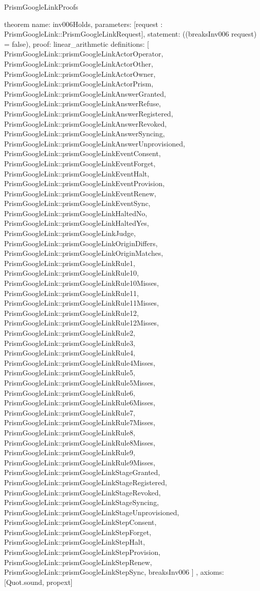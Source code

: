 \begin{lexlean}{PrismGoogleLinkProofs}
\begin{semanticmodule}
theorem{
  name: inv006Holds,
  parameters: [request : PrismGoogleLink::PrismGoogleLinkRequest],
  statement: ((breaksInv006 request) = false),
  proof: linear_arithmetic{
    definitions: [
      PrismGoogleLink::prismGoogleLinkActorOperator,
      PrismGoogleLink::prismGoogleLinkActorOther,
      PrismGoogleLink::prismGoogleLinkActorOwner,
      PrismGoogleLink::prismGoogleLinkActorPrism,
      PrismGoogleLink::prismGoogleLinkAnswerGranted,
      PrismGoogleLink::prismGoogleLinkAnswerRefuse,
      PrismGoogleLink::prismGoogleLinkAnswerRegistered,
      PrismGoogleLink::prismGoogleLinkAnswerRevoked,
      PrismGoogleLink::prismGoogleLinkAnswerSyncing,
      PrismGoogleLink::prismGoogleLinkAnswerUnprovisioned,
      PrismGoogleLink::prismGoogleLinkEventConsent,
      PrismGoogleLink::prismGoogleLinkEventForget,
      PrismGoogleLink::prismGoogleLinkEventHalt,
      PrismGoogleLink::prismGoogleLinkEventProvision,
      PrismGoogleLink::prismGoogleLinkEventRenew,
      PrismGoogleLink::prismGoogleLinkEventSync,
      PrismGoogleLink::prismGoogleLinkHaltedNo,
      PrismGoogleLink::prismGoogleLinkHaltedYes,
      PrismGoogleLink::prismGoogleLinkJudge,
      PrismGoogleLink::prismGoogleLinkOriginDiffers,
      PrismGoogleLink::prismGoogleLinkOriginMatches,
      PrismGoogleLink::prismGoogleLinkRule1,
      PrismGoogleLink::prismGoogleLinkRule10,
      PrismGoogleLink::prismGoogleLinkRule10Misses,
      PrismGoogleLink::prismGoogleLinkRule11,
      PrismGoogleLink::prismGoogleLinkRule11Misses,
      PrismGoogleLink::prismGoogleLinkRule12,
      PrismGoogleLink::prismGoogleLinkRule12Misses,
      PrismGoogleLink::prismGoogleLinkRule2,
      PrismGoogleLink::prismGoogleLinkRule3,
      PrismGoogleLink::prismGoogleLinkRule4,
      PrismGoogleLink::prismGoogleLinkRule4Misses,
      PrismGoogleLink::prismGoogleLinkRule5,
      PrismGoogleLink::prismGoogleLinkRule5Misses,
      PrismGoogleLink::prismGoogleLinkRule6,
      PrismGoogleLink::prismGoogleLinkRule6Misses,
      PrismGoogleLink::prismGoogleLinkRule7,
      PrismGoogleLink::prismGoogleLinkRule7Misses,
      PrismGoogleLink::prismGoogleLinkRule8,
      PrismGoogleLink::prismGoogleLinkRule8Misses,
      PrismGoogleLink::prismGoogleLinkRule9,
      PrismGoogleLink::prismGoogleLinkRule9Misses,
      PrismGoogleLink::prismGoogleLinkStageGranted,
      PrismGoogleLink::prismGoogleLinkStageRegistered,
      PrismGoogleLink::prismGoogleLinkStageRevoked,
      PrismGoogleLink::prismGoogleLinkStageSyncing,
      PrismGoogleLink::prismGoogleLinkStageUnprovisioned,
      PrismGoogleLink::prismGoogleLinkStepConsent,
      PrismGoogleLink::prismGoogleLinkStepForget,
      PrismGoogleLink::prismGoogleLinkStepHalt,
      PrismGoogleLink::prismGoogleLinkStepProvision,
      PrismGoogleLink::prismGoogleLinkStepRenew,
      PrismGoogleLink::prismGoogleLinkStepSync,
      breaksInv006
    ]
  },
  axioms: [Quot.sound, propext]
}


\end{semanticmodule}
\end{lexlean}
